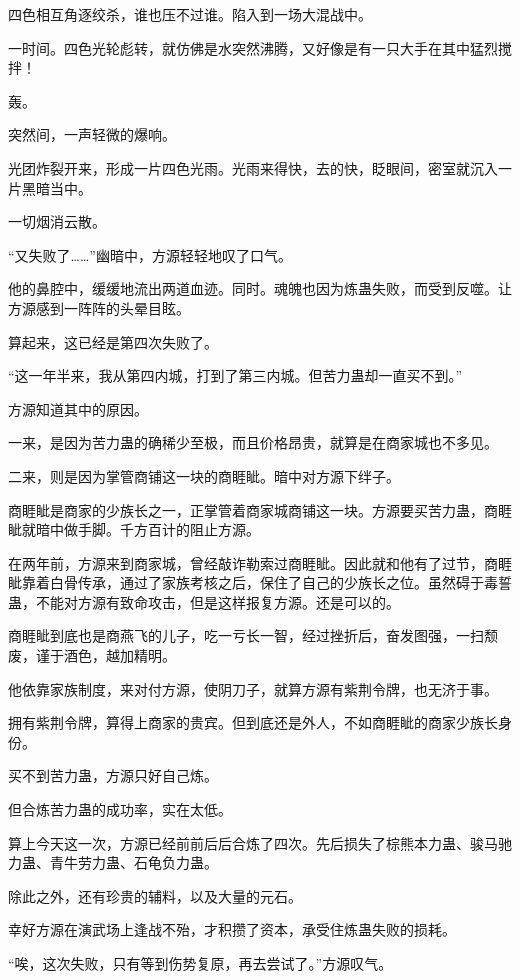 \begin{this_body}
四色相互角逐绞杀，谁也压不过谁。陷入到一场大混战中。

一时间。四色光轮彪转，就仿佛是水突然沸腾，又好像是有一只大手在其中猛烈搅拌！

轰。

突然间，一声轻微的爆响。

光团炸裂开来，形成一片四色光雨。光雨来得快，去的快，眨眼间，密室就沉入一片黑暗当中。

一切烟消云散。

“又失败了……”幽暗中，方源轻轻地叹了口气。

他的鼻腔中，缓缓地流出两道血迹。同时。魂魄也因为炼蛊失败，而受到反噬。让方源感到一阵阵的头晕目眩。

算起来，这已经是第四次失败了。

“这一年半来，我从第四内城，打到了第三内城。但苦力蛊却一直买不到。”

方源知道其中的原因。

一来，是因为苦力蛊的确稀少至极，而且价格昂贵，就算是在商家城也不多见。

二来，则是因为掌管商铺这一块的商睚眦。暗中对方源下绊子。

商睚眦是商家的少族长之一，正掌管着商家城商铺这一块。方源要买苦力蛊，商睚眦就暗中做手脚。千方百计的阻止方源。

在两年前，方源来到商家城，曾经敲诈勒索过商睚眦。因此就和他有了过节，商睚眦靠着白骨传承，通过了家族考核之后，保住了自己的少族长之位。虽然碍于毒誓蛊，不能对方源有致命攻击，但是这样报复方源。还是可以的。

商睚眦到底也是商燕飞的儿子，吃一亏长一智，经过挫折后，奋发图强，一扫颓废，谨于酒色，越加精明。

他依靠家族制度，来对付方源，使阴刀子，就算方源有紫荆令牌，也无济于事。

拥有紫荆令牌，算得上商家的贵宾。但到底还是外人，不如商睚眦的商家少族长身份。

买不到苦力蛊，方源只好自己炼。

但合炼苦力蛊的成功率，实在太低。

算上今天这一次，方源已经前前后后合炼了四次。先后损失了棕熊本力蛊、骏马驰力蛊、青牛劳力蛊、石龟负力蛊。

除此之外，还有珍贵的辅料，以及大量的元石。

幸好方源在演武场上逢战不殆，才积攒了资本，承受住炼蛊失败的损耗。

“唉，这次失败，只有等到伤势复原，再去尝试了。”方源叹气。


\end{this_body}
